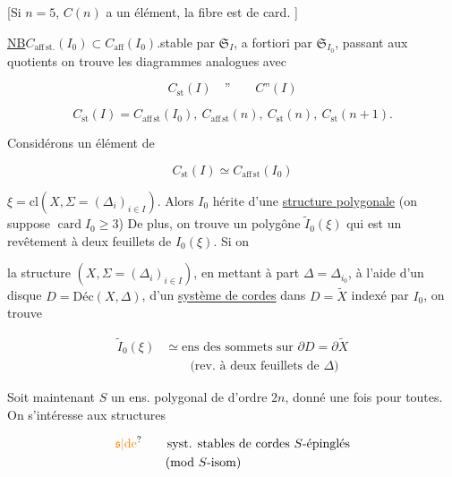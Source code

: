 [Si $n=5$, $C(n)$ a un élément, la fibre est de card. ]

\uline{NB}\quad $C_{\mathrm{aff\,st.}}(I_0)\subset C_{\mathrm{aff}}(I_0)$.\quad stable par $\mathfrak S_I$, a fortiori par $\mathfrak S_{I_0}$, passant aux quotients on trouve les diagrammes analogues avec

\[
C_{\mathrm{st}}(I)\quad\text{''}\qquad C\text{''}(I)
\]

\[
C_{\mathrm{st}}(I)=C_{\mathrm{aff\,st}}(I_0),\ C_{\mathrm{aff\,st}}(n),\ C_{\mathrm{st}}(n),\ C_{\mathrm{st}}(n+1).
\]

Considérons un élément de

\[
 C_{\mathrm{st}}(I)\simeq C_{\mathrm{aff\,st}}(I_0)
\]

$\xi=\mathrm{cl}(X,\Sigma=(\Delta_i)_{i\in I})$. Alors $I_0$ hérite d'une \uline{structure polygonale}  (on suppose $\operatorname{card} I_0\geq 3$) De plus, on trouve un polygône $\widetilde I_0(\xi)$ qui est un revêtement à deux feuillets de $I_0(\xi)$. Si on


  la structure $(X,\Sigma=(\Delta_i)_{i\in I})$, en mettant à part $\Delta=\Delta_{i_0}$, à l'aide d'un disque $D=\mathrm{Déc}(X,\Delta)$,   d'un \uline{système  de cordes} \inserted{$\widetilde\Sigma$} dans $D=\widetilde X$ indexé par $I_0$, on trouve 

\[
\begin{aligned}
\widetilde I_0(\xi)&\simeq\text{ens des sommets sur }\partial D=\partial\widetilde X\\
&\qquad\text{(rev. à deux feuillets de }\Delta\text{)}
\end{aligned}
\]

Soit maintenant $S$ un ens. polygonal de  d'ordre $2n$, donné une fois pour toutes. On s'intéresse aux structures

\[
\begin{aligned}
&\unsure{\mathfrak s|\text{de}}\qquad\text{syst. stables de cordes }S\text{-épinglés}\\
&\hspace{4em}\text{(mod }S\text{-isom)}
\end{aligned}
\]

